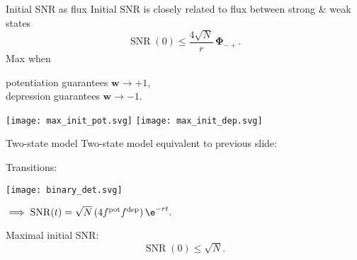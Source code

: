 \documentclass[final]{beamer}%
\DeclareMathOperator{\SNR}{SNR}
\DeclareMathOperator{\snr}{SNR}
\newcommand{\w}{\mathbf{w}}
\newcommand{\F}{\boldsymbol{\Phi}}
\newcommand{\pot}{^{\text{pot}}}
\newcommand{\dep}{^{\text{dep}}}
\newcommand{\initial}{\mathcal{I}}
\newcommand{\area}{\mathcal{A}}
\begin{document}
%


\begin{frame}{Initial SNR as flux}
%
 Initial SNR is closely related to flux between strong \& weak states
 \begin{equation*}
   \SNR(0) \leq \frac{4\sqrt{N}}{r}\,\F_{-+}.
 \end{equation*}
 Max when {\parbox[t]{8cm}{potentiation guarantees $\w\to+1$,\\
 depression guarantees $\w\to-1$.}}
 \begin{center}
   \texttt{[image: max\_init\_pot.svg]}
   \hp \hp
   \texttt{[image: max\_init\_dep.svg]}
 \end{center}
%
\end{frame}


\begin{frame}{Two-state model}
%
 Two-state model equivalent to previous slide:
  \begin{center}
  Transitions:
   \parbox{2cm}{\texttt{[image: binary\_det.svg]}}
   $\implies\snr(t)=\sqrt{N}\,(4 f\pot f\dep)\,\e^{-rt}.$
  \end{center}

 \vp Maximal initial SNR:\note[item]{$f\pot=\half$}
 \begin{equation*}
   \snr(0) \leq \sqrt{N}.
 \end{equation*}
%
\end{frame}
\end{document}
